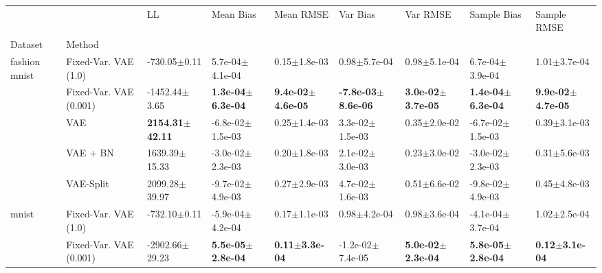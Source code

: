 \begin{tabular}{lllllllll}
\toprule
             &                        &                          LL &                     Mean Bias &                     Mean RMSE &                       Var Bias &                      Var RMSE &                   Sample Bias &                   Sample RMSE \\
Dataset & Method &                             &                               &                               &                                &                               &                               &                               \\
\midrule
fashion mnist & Fixed-Var. VAE (1.0) &            -730.05$\pm$0.11 &           5.7e-04$\pm$4.1e-04 &              0.15$\pm$1.8e-03 &               0.98$\pm$5.7e-04 &              0.98$\pm$5.1e-04 &           6.7e-04$\pm$3.9e-04 &              1.01$\pm$3.7e-04 \\
             & Fixed-Var. VAE (0.001) &           -1452.44$\pm$3.65 &  \textbf{1.3e-04$\pm$6.3e-04} &  \textbf{9.4e-02$\pm$4.6e-05} &  \textbf{-7.8e-03$\pm$8.6e-06} &  \textbf{3.0e-02$\pm$3.7e-05} &  \textbf{1.4e-04$\pm$6.3e-04} &  \textbf{9.9e-02$\pm$4.7e-05} \\
             & VAE &  \textbf{2154.31$\pm$42.11} &          -6.8e-02$\pm$1.5e-03 &              0.25$\pm$1.4e-03 &            3.3e-02$\pm$1.5e-03 &              0.35$\pm$2.0e-02 &          -6.7e-02$\pm$1.5e-03 &              0.39$\pm$3.1e-03 \\
             & VAE + BN &           1639.39$\pm$15.33 &          -3.0e-02$\pm$2.3e-03 &              0.20$\pm$1.8e-03 &            2.1e-02$\pm$3.0e-03 &              0.23$\pm$3.0e-02 &          -3.0e-02$\pm$2.3e-03 &              0.31$\pm$5.6e-03 \\
             & VAE-Split &           2099.28$\pm$39.97 &          -9.7e-02$\pm$4.9e-03 &              0.27$\pm$2.9e-03 &            4.7e-02$\pm$1.6e-03 &              0.51$\pm$6.6e-02 &          -9.8e-02$\pm$4.9e-03 &              0.45$\pm$4.8e-03 \\
mnist & Fixed-Var. VAE (1.0) &            -732.10$\pm$0.11 &          -5.9e-04$\pm$4.2e-04 &              0.17$\pm$1.1e-03 &               0.98$\pm$4.2e-04 &              0.98$\pm$3.6e-04 &          -4.1e-04$\pm$3.7e-04 &              1.02$\pm$2.5e-04 \\
             & Fixed-Var. VAE (0.001) &          -2902.66$\pm$29.23 &  \textbf{5.5e-05$\pm$2.8e-04} &     \textbf{0.11$\pm$3.3e-04} &           -1.2e-02$\pm$7.4e-05 &  \textbf{5.0e-02$\pm$2.3e-04} &  \textbf{5.8e-05$\pm$2.8e-04} &     \textbf{0.12$\pm$3.1e-04} \\

\end{tabular}
